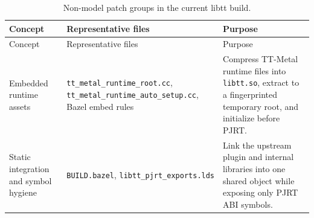 \documentclass[
  10pt,
  american,
  10pt,
  letterpaper]{article}
\begin{document}
\begingroup\small

\begin{longtable}[]{@{}lll@{}}
\caption{Non-model patch groups in the current libtt
build.}\tabularnewline
\toprule
\begin{minipage}[b]{0.30\columnwidth}\raggedright
Concept\strut
\end{minipage} & \begin{minipage}[b]{0.30\columnwidth}\raggedright
Representative files\strut
\end{minipage} & \begin{minipage}[b]{0.30\columnwidth}\raggedright
Purpose\strut
\end{minipage}\tabularnewline
\midrule
\endfirsthead
\toprule
\begin{minipage}[b]{0.30\columnwidth}\raggedright
Concept\strut
\end{minipage} & \begin{minipage}[b]{0.30\columnwidth}\raggedright
Representative files\strut
\end{minipage} & \begin{minipage}[b]{0.30\columnwidth}\raggedright
Purpose\strut
\end{minipage}\tabularnewline
\midrule
\endhead
\begin{minipage}[t]{0.30\columnwidth}\raggedright
Embedded runtime assets\strut
\end{minipage} & \begin{minipage}[t]{0.30\columnwidth}\raggedright
\texttt{tt\_metal\_runtime\_root.cc},
\texttt{tt\_metal\_runtime\_auto\_setup.cc}, Bazel embed rules\strut
\end{minipage} & \begin{minipage}[t]{0.30\columnwidth}\raggedright
Compress TT-Metal runtime files into \texttt{libtt.so}, extract to a
fingerprinted temporary root, and initialize before PJRT.\strut
\end{minipage}\tabularnewline
\begin{minipage}[t]{0.30\columnwidth}\raggedright
Static integration and symbol hygiene\strut
\end{minipage} & \begin{minipage}[t]{0.30\columnwidth}\raggedright
\texttt{BUILD.bazel}, \texttt{libtt\_pjrt\_exports.lds}\strut
\end{minipage} & \begin{minipage}[t]{0.30\columnwidth}\raggedright
Link the upstream plugin and internal libraries into one shared object
while exposing only PJRT ABI symbols.\strut

\end{minipage}
\end{longtable}
\end{document}
